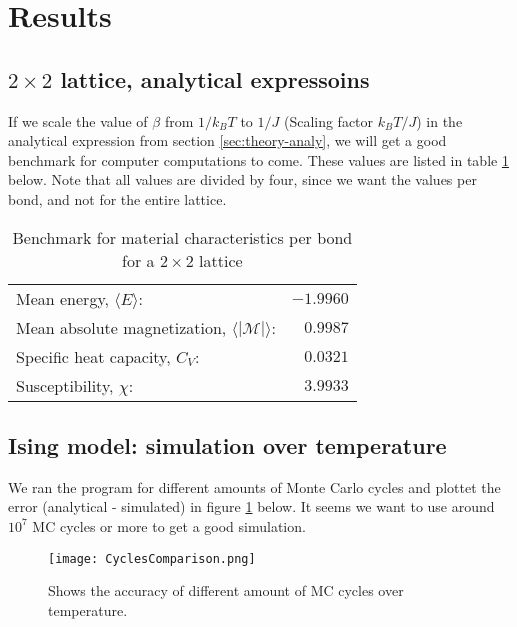 \documentclass[../main.tex]{subfiles}
\begin{document}
\section{Results}
\subsection{$2 \times 2$ lattice, analytical expressoins}
If we scale the value of $\beta$ from $1/k_BT$ to $1/J$ (Scaling factor $k_B T/J$) in the analytical expression from section \ref{sec:theory-analy}, we will get a good benchmark for computer computations to come. These values are listed in table \ref{tab:2x2spinsEnergiesMags} below. Note that all values are divided by four, since we want the values per bond, and not for the entire lattice.
\begin{table}[!h]
\begin{center}
  \begin{tabular}{l r}
    Mean energy, $\langle E \rangle$: & $-1.9960$  \\
    Mean absolute magnetization, $\langle |\mathcal{M}| \rangle$: & $0.9987$ \\
    Specific heat capacity, $C_V$: & $0.0321$\\
    Susceptibility, $\chi$: & $3.9933$
  \end{tabular}
  \caption{Benchmark for material characteristics per bond for a $2 \times 2$ lattice}
  \label{tab:2x2spinsEnergiesMags}
\end{center}
\end{table}
\FloatBarrier

\subsection{Ising model: simulation over temperature}
We ran the program for different amounts of Monte Carlo cycles and plottet the error (analytical - simulated) in figure \ref{fig:results-MCplot} below. It seems we want to use around $10^{7}$ MC cycles or more to get a good simulation.

\begin{figure}[!h]
\texttt{[image: CyclesComparison.png]}
\caption{Shows the accuracy of different amount of MC cycles over temperature.}
\label{fig:results-MCplot}
\end{figure}
\FloatBarrier
\end{document}

